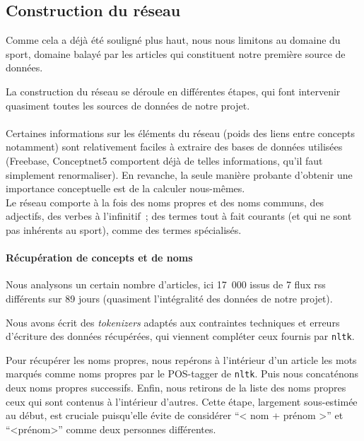 \documentclass[a4paper, 12pt]{article}
\newcommand{\pyt}[1]{\texttt{#1}}%
\newcommand{\ang}[1]{\textit{#1}}%
\begin{document}
\subsection{Construction du réseau}
Comme cela a déjà été souligné plus haut, nous nous limitons au domaine du sport, domaine balayé par les articles qui constituent notre première source de données.

La construction du réseau se déroule en différentes étapes, qui font intervenir quasiment toutes les sources de données de notre projet.


\paragraph{}
Certaines informations sur les éléments du réseau (poids des liens entre concepts notamment) sont relativement faciles à extraire des bases de données utilisées (Freebase, Conceptnet5 comportent déjà de telles informations, qu'il faut simplement renormaliser). En revanche, la seule manière probante d'obtenir une importance conceptuelle est de la calculer nous-mêmes.\\

Le réseau comporte à la fois des noms propres et des noms communs, des adjectifs, des verbes à l'infinitif~; des termes tout à fait courants (et qui ne sont pas inhérents au sport), comme des termes spécialisés.



\paragraph{Récupération de concepts et de noms}

Nous analysons un certain nombre d'articles, ici 17~000 issus de 7 flux rss différents sur 89 jours (quasiment l'intégralité des données de notre projet).


Nous avons écrit des \ang{tokenizers} adaptés aux contraintes techniques et erreurs d'écriture des données récupérées, qui viennent compléter ceux fournis par \pyt{nltk}.

Pour récupérer les noms propres, nous repérons à l'intérieur d'un article les mots marqués comme noms propres par le POS-tagger de \pyt{nltk}. Puis nous concaténons deux noms propres successifs. Enfin, nous retirons de la liste des noms propres ceux qui sont contenus à l'intérieur d'autres. Cette étape, largement sous-estimée au début, est cruciale puisqu'elle évite de considérer ``< nom + prénom >'' et ``<prénom>'' comme deux personnes différentes.\\
\end{document}
